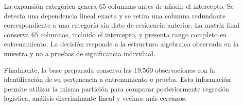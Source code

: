 La expansión categórica genera 65 columnas antes de añadir el intercepto. Se detecta una dependencia lineal exacta y se retira una columna redundante correspondiente a una categoría sin dato de residencia anterior. La matriz final conserva 65 columnas, incluido el intercepto, y presenta rango completo en entrenamiento. La decisión responde a la estructura algebraica observada en la muestra y no a pruebas de significancia individual.

Finalmente, la base preparada conserva las 19.560 observaciones con la identificación de su pertenencia a entrenamiento o prueba. Esta información permite utilizar la misma partición para comparar posteriormente regresión logística, análisis discriminante lineal y vecinos más cercanos.